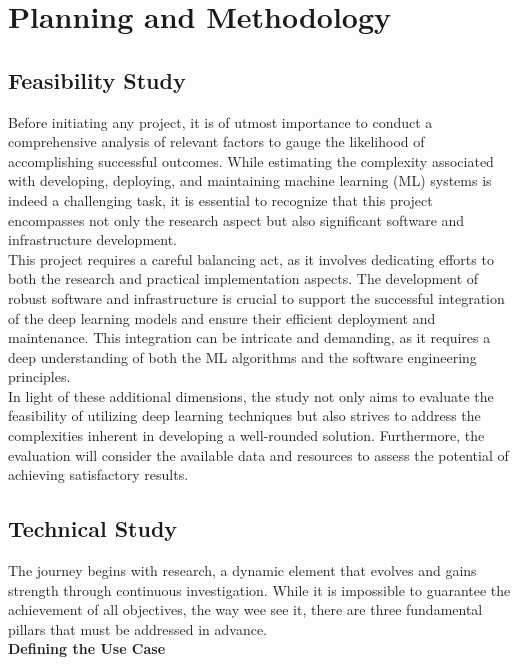 \chapter{Planning and Methodology}
\label{cap:plan}

\section{Feasibility Study}

Before initiating any project, it is of utmost importance to conduct a comprehensive analysis of relevant factors to gauge the likelihood of accomplishing successful outcomes. While estimating the complexity associated with developing, deploying, and maintaining machine learning (ML) systems is indeed a challenging task, it is essential to recognize that this project encompasses not only the research aspect but also significant software and infrastructure development. \\

This project requires a careful balancing act, as it involves dedicating efforts to both the research and practical implementation aspects. The development of robust software and infrastructure is crucial to support the successful integration of the deep learning models and ensure their efficient deployment and maintenance. This integration can be intricate and demanding, as it requires a deep understanding of both the ML algorithms and the software engineering principles. \\

In light of these additional dimensions, the study not only aims to evaluate the feasibility of utilizing deep learning techniques but also strives to address the complexities inherent in developing a well-rounded solution. Furthermore, the evaluation will consider the available data and resources to assess the potential of achieving satisfactory results. 

\section{Technical Study}

The journey begins with research, a dynamic element that evolves and gains strength through continuous investigation. While it is impossible to guarantee the achievement of all objectives, the way wee see it, there are three fundamental pillars that must be addressed in advance. \\

\vspace{0.5cm}
\textbf{Defining the Use Case} \\

